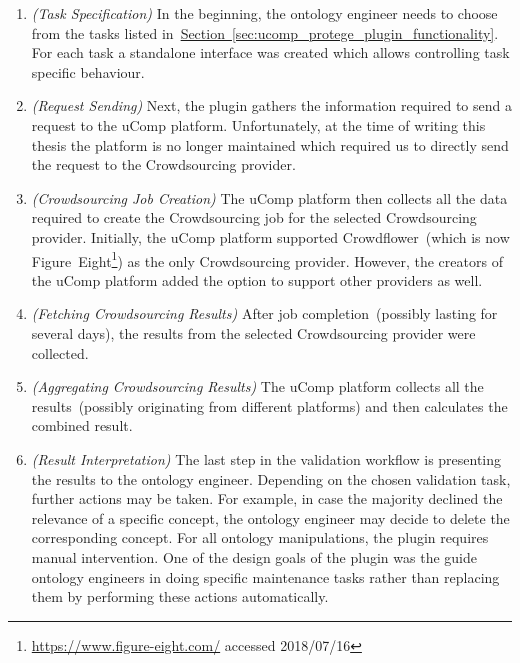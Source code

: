 \begin{enumerate}[label=\textbf{Step \arabic*},leftmargin=\widthof{Step 1}+\labelsep]
	\item \emph{(Task Specification)} In the beginning, the ontology engineer needs to choose from the tasks listed
	in~\hyperref[sec:ucomp_protege_plugin_functionality]{Section~\ref*{sec:ucomp_protege_plugin_functionality}}. For each
	task a standalone interface was created which allows controlling task specific behaviour. 
	\item \emph{(Request Sending)} Next, the plugin gathers the information required to send a request to the uComp platform.
	Unfortunately, at the time of writing this thesis the platform is no longer maintained which required us to directly send the request to the Crowdsourcing provider.  
	\item \emph{(Crowdsourcing Job Creation)} The uComp platform then collects all the data required to create the Crowdsourcing job for the selected Crowdsourcing provider. Initially, the uComp platform supported Crowdflower~(which is now Figure~Eight\footnote{\url{https://www.figure-eight.com/} accessed 2018/07/16}) as the only Crowdsourcing provider. However, the creators of the uComp platform added the option to support other providers as well. 
	\item \emph{(Fetching Crowdsourcing Results)} After job completion~(possibly lasting for several days), the results from the selected Crowdsourcing provider were collected.
	\item \emph{(Aggregating Crowdsourcing Results)} The uComp platform collects all the results~(possibly originating from different platforms) and 
	then calculates the combined result.
	\item \emph{(Result Interpretation)} The last step in the validation workflow is presenting the results to the ontology engineer. Depending on the chosen validation task, further actions may be taken. For example, in case the majority declined the relevance of a specific concept, the ontology engineer may decide to delete the corresponding concept. For all ontology manipulations, the plugin requires manual intervention.
	One of the design goals of the plugin was the guide ontology engineers in doing specific maintenance tasks rather than replacing them by performing these actions automatically. 
\end{enumerate}
